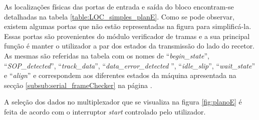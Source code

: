 \documentclass[11pt,a4paper]{article}
\begin{document}
	As localizações físicas das portas de entrada e saída do bloco encontram-se detalhadas na tabela \ref{table:LOC_simples_planE}. Como se pode observar, existem algumas portas que não estão representadas na figura \label{fig:planE} para simplificá-la. Essas portas são provenientes do módulo verificador de tramas e a sua principal função é manter o utilizador a par dos estados da transmissão do lado do recetor.  As mesmas são referidas na tabela com os nomes de ``\textit{begin\_state}'', ``\textit{SOP\_detected}'', ``\textit{track\_data}'', ``\textit{data\_error\_detected }'', ``\textit{idle\_slip}'', ``\textit{wait\_state}'' e ``\textit{align}'' e correspondem aos diferentes estados da máquina apresentada na secção \ref{subsub:serial_frameChecker} na página \pageref{subsub:serial_frameChecker}.
	
	A seleção dos dados no multiplexador que se visualiza na figura \ref{fig:planoE} é feita de acordo com o interruptor \textit{start} controlado pelo utilizador.
	
\end{document}
